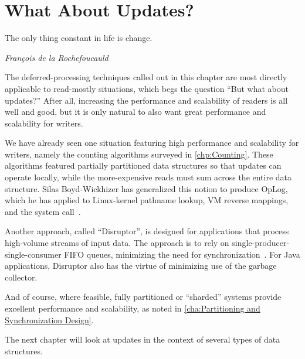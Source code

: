 
\section{What About Updates?}
\label{sec:defer:What About Updates?}
%
\epigraph{The only thing constant in life is change.}
	 {\emph{Fran\c{c}ois de la Rochefoucauld}}

The deferred-processing techniques called out in this chapter are most
directly applicable to read-mostly situations, which begs the question
``But what about updates?''
After all, increasing the performance and scalability of readers is all
well and good, but it is only natural to also want great performance and
scalability for writers.

We have already seen one situation featuring high performance and
scalability for writers, namely the counting algorithms surveyed in
\cref{chp:Counting}.
These algorithms featured partially partitioned data structures so
that updates can operate locally, while the more-expensive reads
must sum across the entire data structure.
Silas Boyd-Wickhizer has generalized this notion to produce
OpLog, which he has applied to
Linux-kernel pathname lookup, VM reverse mappings, and the  system
call~\cite{SilasBoydWickizerPhD}.

Another approach, called ``Disruptor'', is designed for applications
that process high-volume streams of input data.
The approach is to rely on single-producer-single-consumer FIFO queues,
minimizing the need for synchronization~\cite{AdrianSutton2013LCA:Disruptor}.
For Java applications, Disruptor also has the virtue of minimizing use
of the garbage collector.

And of course, where feasible, fully partitioned or ``sharded'' systems
provide excellent performance and scalability, as noted in
\cref{cha:Partitioning and Synchronization Design}.

The next chapter will look at updates in the context of several types
of data structures.
